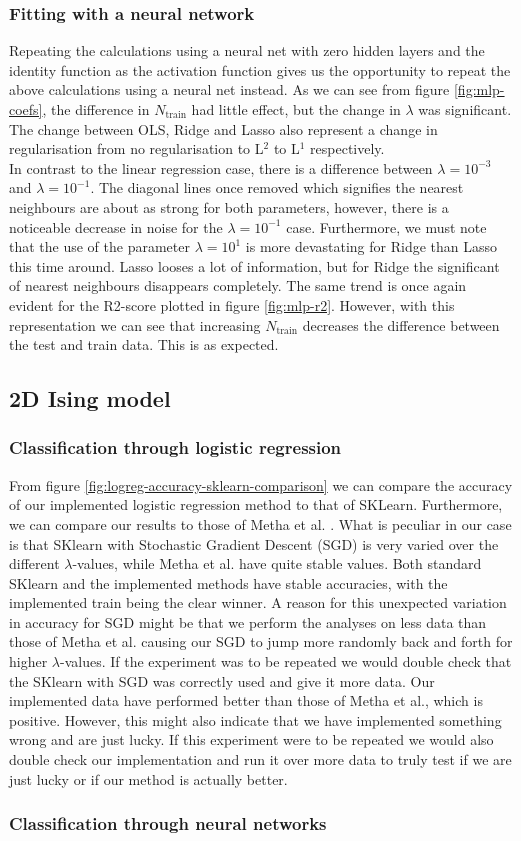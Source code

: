 \subsubsection{Fitting with a neural network}
Repeating the calculations using a neural net with zero hidden layers and the identity function as the activation function gives us the opportunity to repeat the above calculations using a neural net instead. As we can see from figure \ref{fig:mlp-coefs}, the difference in $N_{\text{train}}$ had little effect, but the change in $\lambda$ was significant. The change between OLS, Ridge and Lasso also represent a change in regularisation from no regularisation to L$^2$ to L$^1$ respectively. \\
In contrast to the linear regression case, there is a difference between $\lambda = 10^{-3}$ and $\lambda = 10^{-1}$. The diagonal lines once removed which signifies the nearest neighbours are about as strong for both parameters, however, there is a noticeable decrease in noise for the $\lambda = 10^{-1}$ case. Furthermore, we must note that the use of the parameter $\lambda = 10^{1}$ is more devastating for Ridge than Lasso this time around. Lasso looses a lot of information, but for Ridge the significant of nearest neighbours disappears completely. The same trend is once again evident for the R2-score plotted in figure \ref{fig:mlp-r2}. However, with this representation we can see that increasing $N_{\text{train}}$ decreases the difference between the test and train data. This is as expected.
\subsection{2D Ising model}
\subsubsection{Classification through logistic regression}
From figure \ref{fig:logreg-accuracy-sklearn-comparison} we can compare the accuracy of our implemented logistic regression method to that of SKLearn. Furthermore, we can compare our results to those of Metha et al. \cite{2018arXiv180308823M}. What is peculiar in our case is that SKlearn with Stochastic Gradient Descent (SGD) is very varied over the different $\lambda$-values, while Metha et al. have quite stable values. Both standard SKlearn and the implemented methods have stable accuracies, with the implemented train being the clear winner. A reason for this unexpected variation in accuracy for SGD might be that we perform the analyses on less data than those of Metha et al. causing our SGD to jump more randomly back and forth for higher $\lambda$-values. If the experiment was to be repeated we would double check that the SKlearn with SGD was correctly used and give it more data. Our implemented data have performed better than those of Metha et al., which is positive. However, this might also indicate that we have implemented something wrong and are just lucky. If this experiment were to be repeated we would also double check our implementation and run it over more data to truly test if we are just lucky or if our method is actually better.
\subsubsection{Classification through neural networks}
% 